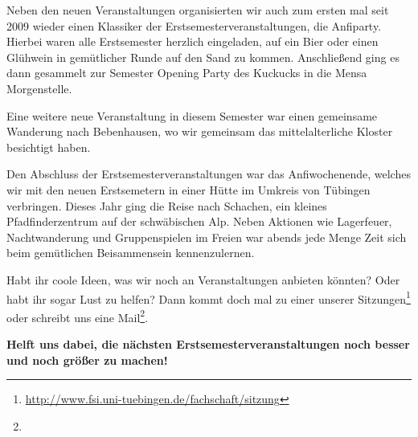 Neben den neuen Veranstaltungen organisierten wir auch zum ersten mal seit 2009 wieder einen Klassiker der Erstsemesterveranstaltungen, die Anfiparty. Hierbei waren alle Erstsemester herzlich eingeladen, auf ein Bier oder einen Glühwein in gemütlicher Runde auf den Sand zu kommen. Anschließend ging es dann gesammelt zur Semester Opening Party des Kuckucks in die Mensa Morgenstelle.

Eine weitere neue Veranstaltung in diesem Semester war einen gemeinsame Wanderung nach Bebenhausen, wo wir gemeinsam das mittelalterliche Kloster besichtigt haben.

Den Abschluss der Erstsemesterveranstaltungen war das Anfiwochenende, welches wir mit den neuen Erstsemetern in einer Hütte im Umkreis von Tübingen verbringen.
Dieses Jahr ging die Reise nach Schachen, ein kleines Pfadfinderzentrum auf der schwäbischen Alp. Neben Aktionen wie Lagerfeuer, Nachtwanderung und Gruppenspielen im Freien war abends jede Menge Zeit sich beim gemütlichen Beisammensein kennenzulernen. 

Habt ihr coole Ideen, was wir noch an Veranstaltungen anbieten könnten? Oder habt ihr sogar Lust zu helfen? Dann kommt doch mal zu einer unserer Sitzungen\footnote{\url{http://www.fsi.uni-tuebingen.de/fachschaft/sitzung}} oder schreibt uns eine Mail\footnote{}.

\textbf{Helft uns dabei, die nächsten Erstsemesterveranstaltungen noch besser und noch größer zu machen!}
